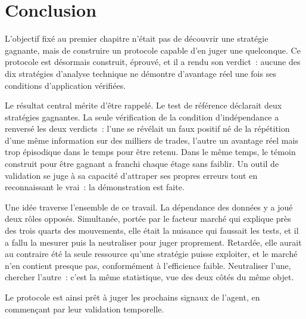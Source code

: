 \chapter{Conclusion}
\label{chap:conclusion}

L'objectif fixé au premier chapitre n'était pas de découvrir une stratégie
gagnante, mais de construire un protocole capable d'en juger une quelconque.
Ce protocole est désormais construit, éprouvé, et il a rendu son verdict~:
aucune des dix stratégies d'analyse technique ne démontre d'avantage réel une
fois ses conditions d'application vérifiées.

Le résultat central mérite d'être rappelé. Le test de référence déclarait deux
stratégies gagnantes. La seule vérification de la condition d'indépendance a
renversé les deux verdicts~: l'une se révélait un faux positif né de la
répétition d'une même information sur des milliers de trades, l'autre un
avantage réel mais trop épisodique dans le temps pour être retenu. Dans le
même temps, le témoin construit pour être gagnant a franchi chaque étage sans
faiblir. Un outil de validation se juge à sa capacité d'attraper ses propres
erreurs tout en reconnaissant le vrai~: la démonstration est faite.

Une idée traverse l'ensemble de ce travail. La dépendance des données y a joué
deux rôles opposés. Simultanée, portée par le facteur marché qui explique près
des trois quarts des mouvements, elle était la nuisance qui faussait les
tests, et il a fallu la mesurer puis la neutraliser pour juger proprement.
Retardée, elle aurait au contraire été la seule ressource qu'une stratégie
puisse exploiter, et le marché n'en contient presque pas, conformément à
l'efficience faible. Neutraliser l'une, chercher l'autre~: c'est la même
statistique, vue des deux côtés du même objet.

Le protocole est ainsi prêt à juger les prochains signaux de l'agent, en
commençant par leur validation temporelle.
